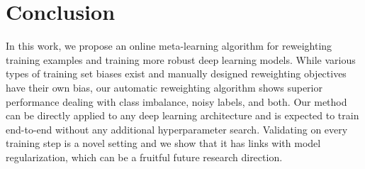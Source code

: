
\section{Conclusion}
In this work, we propose an online meta-learning algorithm for reweighting training examples and
training more robust deep learning models. While various types of training set biases exist and
manually designed reweighting objectives have their own bias, our automatic reweighting algorithm
shows superior performance dealing with class imbalance, noisy labels, and both. Our method can be
directly applied to any deep learning architecture and is expected to train end-to-end without any
additional hyperparameter search. Validating on every training step is a novel setting and we show
that it has links with model regularization, which can be a fruitful future research direction.
